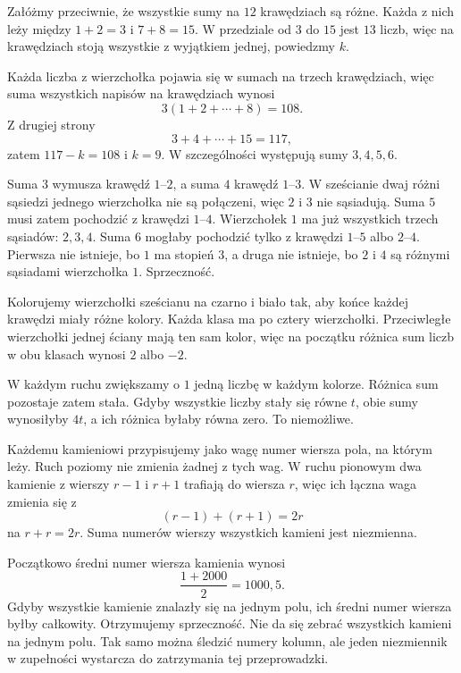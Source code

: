 \documentclass{lecture-kuznia}
\begin{document}
\begin{solution*}[\ref{Z7}]
	Załóżmy przeciwnie, że wszystkie sumy na $12$ krawędziach są różne.
	Każda z nich leży między $1+2=3$ i $7+8=15$. W przedziale od $3$ do $15$
	jest $13$ liczb, więc na krawędziach stoją wszystkie z wyjątkiem jednej,
	powiedzmy $k$.

	Każda liczba z wierzchołka pojawia się w sumach na trzech krawędziach,
	więc suma wszystkich napisów na krawędziach wynosi
	\[
		3(1+2+\cdots+8)=108.
	\]
	Z drugiej strony
	\[
		3+4+\cdots+15=117,
	\]
	zatem $117-k=108$ i $k=9$. W szczególności występują sumy $3,4,5,6$.

	Suma $3$ wymusza krawędź $1$--$2$, a suma $4$ krawędź $1$--$3$.
	W sześcianie dwaj różni sąsiedzi jednego wierzchołka nie są połączeni,
	więc $2$ i $3$ nie sąsiadują. Suma $5$ musi zatem pochodzić z krawędzi
	$1$--$4$. Wierzchołek $1$ ma już wszystkich trzech sąsiadów: $2,3,4$.
	Suma $6$ mogłaby pochodzić tylko z krawędzi $1$--$5$ albo $2$--$4$.
	Pierwsza nie istnieje, bo $1$ ma stopień $3$, a druga nie istnieje, bo
	$2$ i $4$ są różnymi sąsiadami wierzchołka $1$. Sprzeczność.
\end{solution*}

\begin{solution*}[\ref{Z8}]
	Kolorujemy wierzchołki sześcianu na czarno i biało tak, aby końce każdej
	krawędzi miały różne kolory. Każda klasa ma po cztery wierzchołki.
	Przeciwległe wierzchołki jednej ściany mają ten sam kolor, więc na początku
	różnica sum liczb w obu klasach wynosi $2$ albo $-2$.

	W każdym ruchu zwiększamy o $1$ jedną liczbę w każdym kolorze. Różnica sum
	pozostaje zatem stała. Gdyby wszystkie liczby stały się równe $t$, obie
	sumy wynosiłyby $4t$, a ich różnica byłaby równa zero. To niemożliwe.
\end{solution*}

\begin{solution*}[\ref{Z9}]
	Każdemu kamieniowi przypisujemy jako wagę numer wiersza pola, na którym
	leży. Ruch poziomy nie zmienia żadnej z tych wag. W ruchu pionowym dwa
	kamienie z wierszy $r-1$ i $r+1$ trafiają do wiersza $r$, więc ich łączna
	waga zmienia się z
	\[
		(r-1)+(r+1)=2r
	\]
	na $r+r=2r$. Suma numerów wierszy wszystkich kamieni jest niezmienna.

	Początkowo średni numer wiersza kamienia wynosi
	\[
		\frac{1+2000}{2}=1000{,}5.
	\]
	Gdyby wszystkie kamienie znalazły się na jednym polu, ich średni numer
	wiersza byłby całkowity. Otrzymujemy sprzeczność. Nie da się zebrać
	wszystkich kamieni na jednym polu. Tak samo można śledzić numery kolumn,
	ale jeden niezmiennik w zupełności wystarcza do zatrzymania tej przeprowadzki.
\end{solution*}
\end{document}
